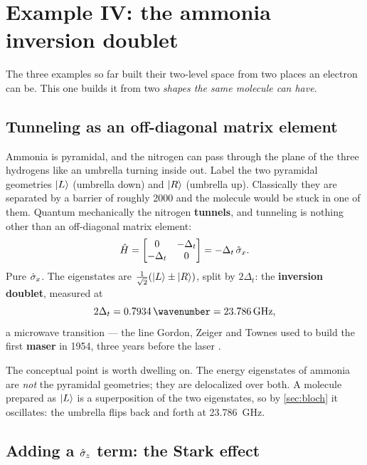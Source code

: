 \section{Example IV: the ammonia inversion doublet}
\label{sec:ammonia}

The three examples so far built their two-level space from two places an electron can
be. This one builds it from two \emph{shapes the same molecule can have}.

\subsection{Tunneling as an off-diagonal matrix element}

Ammonia is pyramidal, and the nitrogen can pass through the plane of the three hydrogens
like an umbrella turning inside out. Label the two pyramidal geometries $\ket{L}$
(umbrella down) and $\ket{R}$ (umbrella up). Classically they are separated by a barrier
of roughly \SI{2000}{\wavenumber} and the molecule would be stuck in one of them.
Quantum mechanically the nitrogen \textbf{tunnels}, and tunneling is nothing other than
an off-diagonal matrix element:
%
\begin{equation}
\hat{H} = \begin{bmatrix} 0 & -\Delta_t \\ -\Delta_t & 0\end{bmatrix} = -\Delta_t\,\hat{\sigma}_x .
\label{eq:nh3-bare}
\end{equation}
%
Pure $\hat{\sigma}_x$. The eigenstates are $\tfrac{1}{\sqrt2}(\ket{L}\pm\ket{R})$, split by
$2\Delta_t$: the \textbf{inversion doublet}, measured at
%
\begin{equation}
2\Delta_t = \SI{0.7934}{\wavenumber} = \SI{23.786}{\giga\hertz},
\end{equation}
%
a microwave transition --- the line Gordon, Zeiger and Townes used to build the first
\textbf{maser} in 1954, three years before the laser \cite{Townes1955}.

The conceptual point is worth dwelling on. The energy eigenstates of ammonia are
\emph{not} the pyramidal geometries; they are delocalized over both. A molecule prepared
as $\ket{L}$ is a superposition of the two eigenstates, so by \cref{sec:bloch} it
oscillates: the umbrella flips back and forth at \SI{23.786}{\giga\hertz}.

\subsection{Adding a $\hat{\sigma}_z$ term: the Stark effect}

